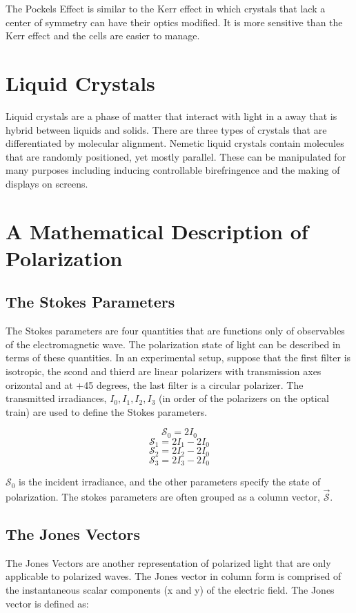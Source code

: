 \documentclass[12pt]{report}
\begin{document}
The Pockels Effect is similar to the Kerr effect in which crystals that lack a center of symmetry can have their optics modified. It is more sensitive than the Kerr effect and the cells are easier to manage. 

\section{Liquid Crystals}
 Liquid crystals are a phase of matter that interact with light in a away that is hybrid between liquids and solids. There are three types of crystals that are differentiated by molecular alignment. Nemetic liquid crystals contain molecules that are randomly positioned, yet mostly parallel. These can be manipulated for many purposes including inducing controllable birefringence and the making of displays on screens. 
\section{A Mathematical Description of Polarization}
 \subsection{The Stokes Parameters}
 The Stokes parameters are four quantities that are functions only of observables of the electromagnetic wave. The polarization state of light can be described in terms of these quantities. In an experimental setup, suppose that the first filter is isotropic, the scond and thierd are linear polarizers with transmission axes orizontal and at +45 degrees, the last filter is a circular polarizer. The transmitted irradiances, $I_0, I_1, I_2, I_3$ (in order of the polarizers on the optical train) are used to define the Stokes parameters. 
 
\[\mathcal{S}_0 = 2I_0\]
\[\mathcal{S}_1 = 2I_1-2I_0\]
\[\mathcal{S}_2 = 2I_2-2I_0\]
\[\mathcal{S}_3 = 2I_3-2I_0\]

$\mathcal{S}_0$ is the incident irradiance, and the other parameters specify the state of polarization. The stokes parameters are often grouped as a column vector, $\vec{\mathcal{S}}$.
\subsection{The Jones Vectors}
The Jones Vectors are another representation of polarized light that are only applicable to polarized waves. The Jones vector in column form is comprised of the instantaneous scalar components (x and y) of the electric field. The Jones vector is defined as:
\end{document}

